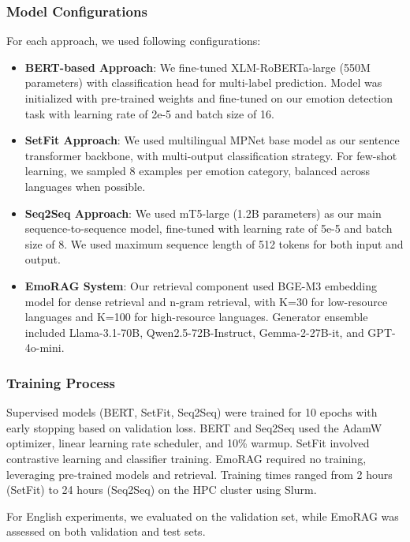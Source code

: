\documentclass[a4paper,12pt]{extarticle}
\begin{document}
\subsubsection{Model Configurations}

For each approach, we used following configurations:

\begin{itemize}
\item \textbf{BERT-based Approach}: We fine-tuned XLM-RoBERTa-large (550M parameters) with classification head for multi-label prediction. Model was initialized with pre-trained weights and fine-tuned on our emotion detection task with learning rate of 2e-5 and batch size of 16.

\item \textbf{SetFit Approach}: We used multilingual MPNet base model as our sentence transformer backbone, with multi-output classification strategy. For few-shot learning, we sampled 8 examples per emotion category, balanced across languages when possible.

\item \textbf{Seq2Seq Approach}: We used mT5-large (1.2B parameters) as our main sequence-to-sequence model, fine-tuned with learning rate of 5e-5 and batch size of 8. We used maximum sequence length of 512 tokens for both input and output.

\item \textbf{EmoRAG System}: Our retrieval component used BGE-M3 embedding model for dense retrieval and n-gram retrieval, with K=30 for low-resource languages and K=100 for high-resource languages. Generator ensemble included Llama-3.1-70B, Qwen2.5-72B-Instruct, Gemma-2-27B-it, and GPT-4o-mini.
\end{itemize}

\subsubsection{Training Process}

Supervised models (BERT, SetFit, Seq2Seq) were trained for 10 epochs with early stopping based on validation loss. BERT and Seq2Seq used the AdamW optimizer, linear learning rate scheduler, and 10\% warmup. SetFit involved contrastive learning and classifier training. EmoRAG required no training, leveraging pre-trained models and retrieval. Training times ranged from 2 hours (SetFit) to 24 hours (Seq2Seq) on the HPC cluster using Slurm.

For English experiments, we evaluated on the validation set, while EmoRAG was assessed on both validation and test sets.
\end{document}
